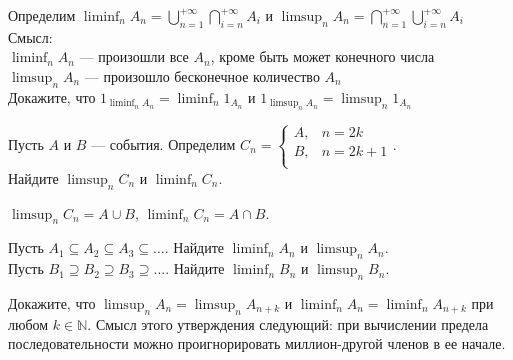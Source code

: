 \begin{problem}
Определим $\liminf_{n}
A_{n}=\bigcup_{n=1}^{+\infty}\bigcap_{i=n}^{+\infty}A_{i}$ и
$\limsup_{n}
A_{n}=\bigcap_{n=1}^{+\infty}\bigcup_{i=n}^{+\infty}A_{i}$ \\
Смысл: \\
$\liminf_{n} A_{n}$ — произошли все $A_{n}$, кроме быть может
конечного числа \\
$\limsup_{n} A_{n}$ — произошло бесконечное количество $A_{n}$ \\
Докажите, что $1_{\liminf_{n}A_{n}}=\liminf_{n}1_{A_{n}}$ и
$1_{\limsup_{n}A_{n}}=\limsup_{n}1_{A_{n}}$

\begin{sol}

\end{sol}
\end{problem}

\begin{problem}
Пусть $A$ и $B$ — события. Определим $C_{n}=
\begin{cases}
  A, & n=2k \\
  B, & n=2k+1 \\
\end{cases}$. \\
Найдите $\limsup_{n}C_{n}$ и $\liminf_{n}C_{n}$.

\begin{sol}
$\limsup_{n}C_{n}=A\cup B$, $\liminf_{n}C_{n}=A\cap B$.
\end{sol}
\end{problem}

\begin{problem}
Пусть $A_{1} \subseteq A_{2} \subseteq A_{3} \subseteq \ldots$.
Найдите $\liminf_{n}A_{n}$ и $\limsup_{n}A_{n}$. \\
Пусть $B_{1} \supseteq B_{2} \supseteq B_{3} \supseteq \ldots$.
Найдите $\liminf_{n}B_{n}$ и $\limsup_{n}B_{n}$.


\begin{sol}

\end{sol}
\end{problem}

\begin{problem}
Докажите, что $\limsup_{n}A_{n}=\limsup_{n}A_{n+k}$ и
$\liminf_{n}A_{n}=\liminf_{n}A_{n+k}$ при любом $k\in\mathbb{N}$.
Смысл этого утверждения следующий: при вычислении предела
последовательности можно проигнорировать миллион-другой членов в
ее начале.

\begin{sol}

\end{sol}
\end{problem}

